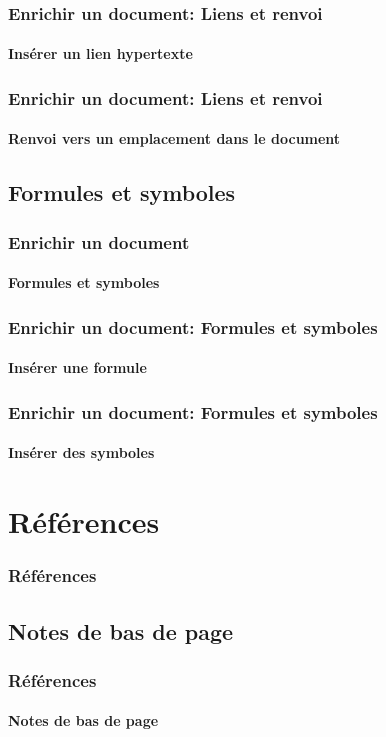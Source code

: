 \documentclass[xcolor=table]{beamer}
\begin{document}
\begin{frame}
\frametitle{Enrichir un document: Liens et renvoi}
\framesubtitle{Insérer un lien hypertexte}

\end{frame}

\begin{frame}
\frametitle{Enrichir un document: Liens et renvoi}
\framesubtitle{Renvoi vers un emplacement dans le document}

\end{frame}

\subsection{Formules et symboles}

\begin{frame}
\frametitle{Enrichir un document}
\framesubtitle{Formules et symboles}

\end{frame}

\begin{frame}
\frametitle{Enrichir un document: Formules et symboles}
\framesubtitle{Insérer une formule}

\end{frame}

\begin{frame}
\frametitle{Enrichir un document: Formules et symboles}
\framesubtitle{Insérer des symboles}

\end{frame}

\section{Références}

\begin{frame}
\frametitle{Références}

\end{frame}

\subsection{Notes de bas de page}

\begin{frame}
\frametitle{Références}
\framesubtitle{Notes de bas de page}

\end{frame}
\end{document}
